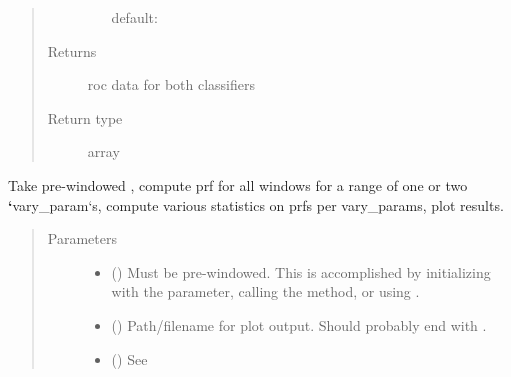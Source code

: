 \documentclass[letterpaper,10pt,openany,oneside,english]{sphinxmanual}
\begin{document}
\begin{fulllineitems}
\begin{quote}
\begin{description}
\begin{itemize}
default: 


\end{itemize}

\item[{Returns}] \leavevmode
roc data for both classifiers

\item[{Return type}] \leavevmode
array

\end{description}\end{quote}

\end{fulllineitems}


\begin{fulllineitems}
\label{\detokenize{prfstats:prfstats.plot_variance}}
Take pre-windowed , compute prf for all windows for a range
of one or two {\color{red}\bfseries{}{}`}vary\_param{}`s, compute various statistics on prfs per
vary\_params, plot results.
\begin{quote}\begin{description}
\item[{Parameters}] \leavevmode\begin{itemize}
\item {} 
 ({\hyperref[\detokenize{signals:signals.Trajectory}]{}}) \textendash{} Must be pre-windowed. This is accomplished by initializing with the
 parameter, calling the  method, or using
.

\item {} 
 () \textendash{} Path/filename for plot output. Should probably end with .

\item {} 
 () \textendash{} See {\hyperref[\detokenize{phomology:phomology.build_filtration.build_filtration}]{}}


\end{itemize}
\end{description}
\end{quote}
\end{fulllineitems}
\end{document}
